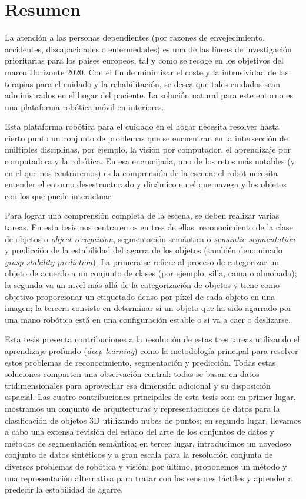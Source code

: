 \chapter{Resumen}

La atención a las personas dependientes (por razones de envejecimiento, accidentes, discapacidades o enfermedades) es una de las líneas de investigación prioritarias para los países europeos, tal y como se recoge en los objetivos del marco Horizonte 2020. Con el fin de minimizar el coste y la intrusividad de las terapias para el cuidado y la rehabilitación, se desea que tales cuidados sean administrados en el hogar del paciente. La solución natural para este entorno es una plataforma robótica móvil en interiores.

Esta plataforma robótica para el cuidado en el hogar necesita resolver hasta cierto punto un conjunto de problemas que se encuentran en la intersección de múltiples disciplinas, por ejemplo, la visión por computador, el aprendizaje por computadora y la robótica. En esa encrucijada, uno de los retos más notables (y en el que nos centraremos) es la comprensión de la escena: el robot necesita entender el entorno desestructurado y dinámico en el que navega y los objetos con los que puede interactuar.

Para lograr una comprensión completa de la escena, se deben realizar varias tareas. En esta tesis nos centraremos en tres de ellas: reconocimiento de la clase de objetos o \emph{object recognition}, segmentación semántica o \emph{semantic segmentation} y predicción de la estabilidad del agarra de los objetos (también denominado \emph{grasp stability prediction}). La primera se refiere al proceso de categorizar un objeto de acuerdo a un conjunto de clases (por ejemplo, silla, cama o almohada); la segunda va un nivel más allá de la categorización de objetos y tiene como objetivo proporcionar un etiquetado denso por píxel de cada objeto en una imagen; la tercera consiste en determinar si un objeto que ha sido agarrado por una mano robótica está en una configuración estable o si va a caer o deslizarse.

Esta tesis presenta contribuciones a la resolución de estas tres tareas utilizando el aprendizaje profundo (\emph{deep learning}) como la metodología principal para resolver estos problemas de reconocimiento, segmentación y predicción. Todas estas soluciones comparten una observación central: todas se basan en datos tridimensionales para aprovechar esa dimensión adicional y su disposición espacial. Las cuatro contribuciones principales de esta tesis son: en primer lugar, mostramos un conjunto de arquitecturas y representaciones de datos para la clasificación de objetos 3D utilizando nubes de puntos; en segundo lugar, llevamos a cabo una extensa revisión del estado del arte de los conjuntos de datos y métodos de segmentación semántica; en tercer lugar, introducimos un novedoso conjunto de datos sintéticos y a gran escala para la resolución conjunta de diversos problemas de robótica y visión; por último, proponemos un método y una representación alternativa para tratar con los sensores táctiles y aprender a predecir la estabilidad de agarre.